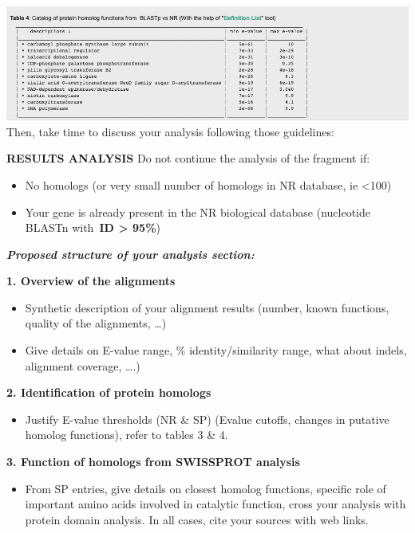 \documentclass[
]{book}
\providecommand{\tightlist}{%
  \setlength{\itemsep}{0pt}\setlength{\parskip}{0pt}}
\begin{document}
\includegraphics{figures/Annotathon/Annot_table4_BLAST.png}
Then, take time to discuss your analysis following those guidelines:

\textbf{RESULTS ANALYSIS}
Do not continue the analysis of the fragment if:

\begin{itemize}
\tightlist
\item
  No homologs (or very small number of homologs in NR database, ie \textless100)
\item
  Your gene is already present in the NR biological database (nucleotide BLASTn with~\textbf{ID \textgreater{} 95\%})
\end{itemize}

\emph{\textbf{Proposed structure of your analysis section:}}

\textbf{1. Overview of the alignments}

\begin{itemize}
\tightlist
\item
  Synthetic description of your alignment results (number, known functions, quality of the alignments, \ldots)
\item
  Give details on E-value range, \% identity/similarity range, what about indels, alignment coverage, \ldots.)
\end{itemize}

\textbf{2. Identification of protein homologs}

\begin{itemize}
\tightlist
\item
  Justify E-value thresholds (NR \& SP) (Evalue cutoffs, changes in putative homolog functions), refer to tables 3 \& 4.
\end{itemize}

\textbf{3. Function of homologs from SWISSPROT analysis}

\begin{itemize}
\tightlist
\item
  From SP entries, give details on closest homolog functions, specific role of important amino acids involved in catalytic function, cross your analysis with protein domain analysis. In all cases, cite your sources with web links.
\end{itemize}
\end{document}
